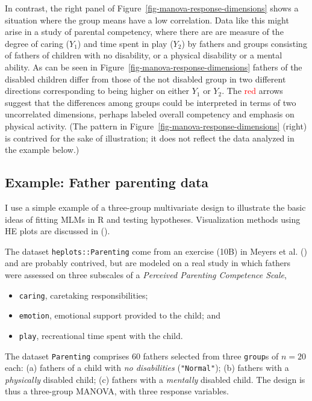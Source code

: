 \documentclass[
  letterpaper,
  10pt,
  krantz2]{krantz}
\providecommand{\tightlist}{%
  \setlength{\itemsep}{0pt}\setlength{\parskip}{0pt}}\usepackage{longtable,booktabs,array}
\begin{document}
In contrast, the right panel of
Figure~\ref{fig-manova-response-dimensions} shows a situation where the
group means have a low correlation. Data like this might arise in a
study of parental competency, where there are are measure of the degree
of caring (\(Y_1\)) and time spent in play (\(Y_2\)) by fathers and
groups consisting of fathers of children with no disability, or a
physical disability or a mental ability. As can be seen in
Figure~\ref{fig-manova-response-dimensions} fathers of the disabled
children differ from those of the not disabled group in two different
directions corresponding to being higher on either \(Y_1\) or \(Y_2\).
The \textcolor{red}{red} arrows suggest that the differences among
groups could be interpreted in terms of two uncorrelated dimensions,
perhaps labeled overall competency and emphasis on physical activity.
(The pattern in Figure~\ref{fig-manova-response-dimensions} (right) is
contrived for the sake of illustration; it does not reflect the data
analyzed in the example below.)

\subsection{Example: Father parenting
data}\label{example-father-parenting-data}

I use a simple example of a three-group multivariate design to
illustrate the basic ideas of fitting MLMs in R and testing hypotheses.
Visualization methods using HE plots are discussed in
().

The dataset \texttt{heplots::Parenting} come from an exercise (10B) in
Meyers et al. () and are probably
contrived, but are modeled on a real study in which fathers were
assessed on three subscales of a \emph{Perceived Parenting Competence
Scale},

\begin{itemize}
\tightlist
\item
  \texttt{caring}, caretaking responsibilities;
\item
  \texttt{emotion}, emotional support provided to the child; and
\item
  \texttt{play}, recreational time spent with the child.
\end{itemize}

The dataset \texttt{Parenting} comprises 60 fathers selected from three
\texttt{group}s of \(n = 20\) each: (a) fathers of a child with \emph{no
disabilities} (\texttt{"Normal"}); (b) fathers with a \emph{physically}
disabled child; (c) fathers with a \emph{mentally} disabled child. The
design is thus a three-group MANOVA, with three response variables.
\end{document}
